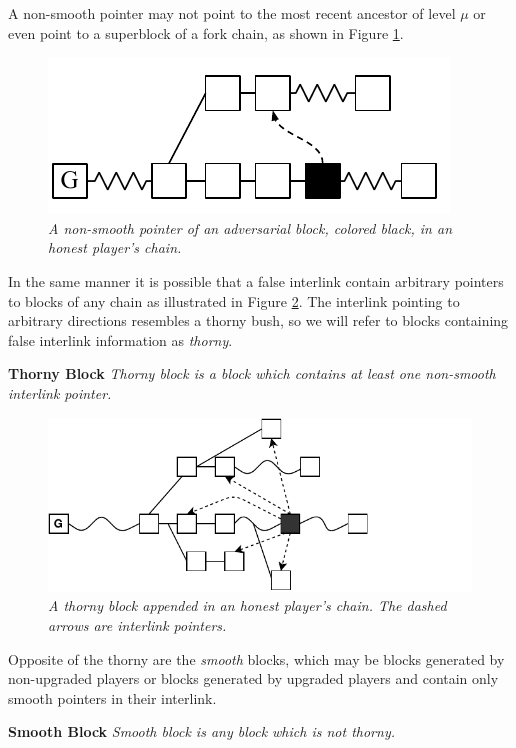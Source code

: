 A non-smooth pointer may not point to the most recent ancestor of level $\mu$ or even point to a superblock of a fork chain, as shown in Figure \ref{fig:false_interlink}.

\begin{figure}[h]
	\begin{center}
		\includegraphics[scale=0.7]{figures/false_interlink.pdf}
	\end{center}
    \caption{\textit{A non-smooth pointer of an adversarial block, colored
    black, in an honest player's chain.}}
	\label{fig:false_interlink}
\end{figure}

In the same manner it is possible that a false interlink contain arbitrary pointers to blocks of any chain as illustrated in Figure \ref{fig:thorny_block}. The interlink pointing to arbitrary directions resembles a thorny bush, so we will refer to blocks containing false interlink information as \emph{thorny}. 

\begin{defn}{\textbf{Thorny Block}}
	\textit{Thorny block is a block which contains at least one non-smooth interlink pointer.}
	\label{defn:thorny_block}
\end{defn}

\begin{figure}[h]
	\begin{center}
		\includegraphics[scale=0.75]{figures/thorny_block.pdf}
	\end{center}
	\caption{\textit{A thorny block appended in an honest player's chain. The dashed arrows
	are interlink pointers.}}
	\label{fig:thorny_block}
\end{figure}

Opposite of the thorny are the \emph{smooth} blocks, which may be blocks generated by non-upgraded players or blocks generated by upgraded players and contain only smooth pointers in their interlink.

\begin{defn}{\textbf{Smooth Block}}
	\textit{Smooth block is any block which is not thorny.}
	\label{defn:smooth_block}
\end{defn}
